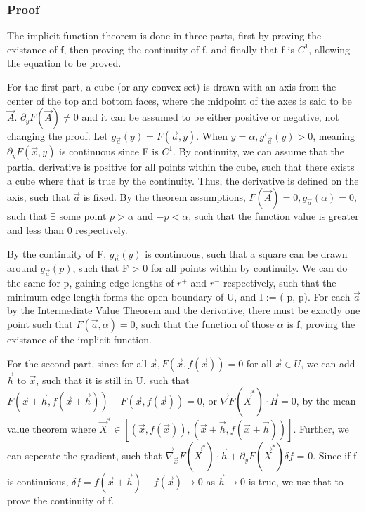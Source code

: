 \documentclass[11 pt, twoside]{article}
\begin{document}
\subsubsection{Proof}
The implicit function theorem is done in three parts, first by proving the existance of f, then proving the continuity of f, and finally that f is $C^1$, allowing the equation to be proved.

For the first part, a cube (or any convex set) is drawn with an axis from the center of the top and bottom faces, where the midpoint of the axes is said to be $\vec{A}$. $\partial_yF(\vec{A}) \neq 0$ and it can be assumed to be either positive or negative, not changing the proof. Let $g_\vec{a}(y) = F(\vec{a}, y)$. When $y = \alpha, g'_\vec{a}(y) > 0$, meaning $\partial_yF(\vec{x}, y)$ is continuous since F is $C^1$. By continuity, we can assume that the partial derivative is positive for all points within the cube, such that there exists a cube where that is true by the continuity. Thus, the derivative is defined on the axis, such that $\vec{a}$ is fixed. By the theorem assumptions, $F(\vec{A}) = 0, g_\vec{a}(\alpha) = 0$, such that $\exists$ some point $p > \alpha$ and $-p < \alpha$, such that the function value is greater and less than 0 respectively.

By the continuity of F, $g_\vec{a}(y)$ is continuous, such that a square can be drawn around  $g_\vec{a}(p)$, such that F > 0 for all points within by continuity. We can do the same for p, gaining edge lengths of $r^+$ and $r^-$ respectively, such that the minimum edge length forms the open boundary of U, and I := (-p, p). For each $\vec{a}$ by the Intermediate Value Theorem and the derivative, there must be exactly one point such that $F(\vec{a}, \alpha) = 0$, such that the function of those $\alpha$ is f, proving the existance of the implicit function.

For the second part, since for all $\vec{x}, F(\vec{x}, f(\vec{x})) = 0$ for all $\vec{x} \in U$, we can add $\vec{h}$ to $\vec{x}$, such that it is still in U, such that $F(\vec{x}+\vec{h}, f(\vec{x} + \vec{h})) - F(\vec{x}, f(\vec{x})) = 0$, or $\vec{\nabla}F(\vec{X}^*) \cdot \vec{H} = 0$, by the mean value theorem where $\vec{X}^* \in [(\vec{x}, f(\vec{x})), (\vec{x} + \vec{h}, f(\vec{x} + \vec{h}))]$. Further, we can seperate the gradient, such that $\vec{\nabla}_\vec{x}F(\vec{X}^*) \cdot \vec{h} + \partial_yF(\vec{X}^*)\delta f$ = 0. Since if f is continuious, $\delta f = f(\vec{x} + \vec{h}) - f(\vec{x}) \to 0$ as $\vec{h} \to 0$ is true, we use that to prove the continuity of f.
\end{document}
